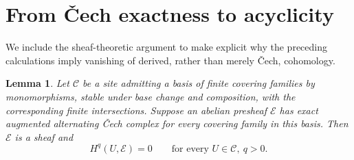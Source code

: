\documentclass[11pt]{article}
\newtheorem{lemma}[theorem]{Lemma}
\theoremstyle{definition}
\theoremstyle{remark}
\begin{document}
\section{From \v{C}ech exactness to acyclicity}

We include the sheaf-theoretic argument to make explicit why the
preceding calculations imply vanishing of derived, rather than
merely \v{C}ech, cohomology.

\begin{lemma}\label{lem:cech-criterion}
Let \(\mathcal C\) be a site admitting a basis of finite covering
families by monomorphisms, stable under base change and
composition, with the corresponding finite intersections.
Suppose an abelian presheaf \(\mathcal E\) has exact augmented
alternating \v{C}ech complex for every covering family in this
basis. Then \(\mathcal E\) is a sheaf and
\[
H^q(U,\mathcal E)=0
\qquad\text{for every }U\in\mathcal C,\ q>0.
\]
\end{lemma}

\end{document}
